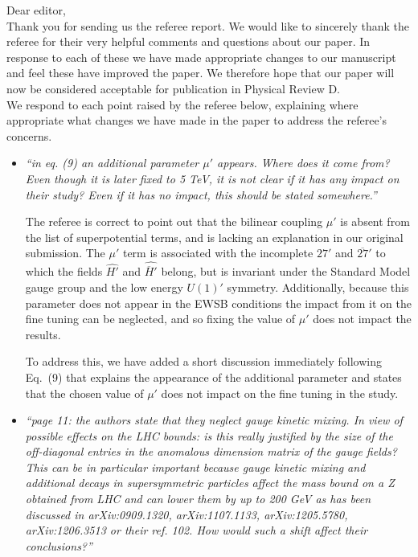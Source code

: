 \documentclass[12pt]{article}
\begin{document}
\noindent Dear editor,
\\

\noindent Thank you for sending us the referee report.  We would like to
sincerely thank the referee for their very helpful comments and questions
about our paper.  In response to each of these we have made appropriate
changes to our manuscript and feel these have improved the paper.  We
therefore hope that our paper will now be considered acceptable for
publication in Physical Review D.
\\
\noindent We respond to each point raised by the referee below, explaining
where appropriate what changes we have made in the paper to address the
referee's concerns.

\begin{itemize}
\item {\it ``in eq. (9) an additional parameter $\mu'$ appears.  Where
does it come from?  Even though it is later fixed to 5 TeV, it is not
clear if it has any impact on their study?  Even if it has no impact,
this should be stated somewhere.''}

The referee is correct to point out that the bilinear coupling $\mu'$
is absent from the list of superpotential terms, and is lacking an
explanation in our original submission. The $\mu'$ term is associated
with the incomplete $27'$ and $\overline{27}'$ to which the fields
$\hat{H'}$ and $\hat{\overline{H}'}$ belong, but is invariant under
the Standard Model gauge group and the low energy $U(1)'$
symmetry.  Additionally, because this parameter does not appear in the
EWSB conditions the impact from it on the fine tuning can be
neglected, and so fixing the value of $\mu'$ does not impact the
results.

To address this, we have added a short discussion immediately
following Eq.~(9) that explains the appearance of the additional parameter
and states that the chosen value of $\mu'$ does not impact on the fine
tuning in the study.

\item {\it ``page 11: the authors state that they neglect gauge kinetic
mixing.  In view of possible effects on the LHC bounds: is this really
justified by the size of the off-diagonal entries in the anomalous
dimension matrix of the gauge fields?  This can be in particular important
because gauge kinetic mixing and additional decays in supersymmetric
particles affect the mass bound on a Z obtained from LHC and can lower them
by up to 200 GeV as has been discussed in arXiv:0909.1320, arXiv:1107.1133,
arXiv:1205.5780, arXiv:1206.3513 or their ref. 102.  How would such a shift
affect their conclusions?''}


\end{itemize}
\end{document}
